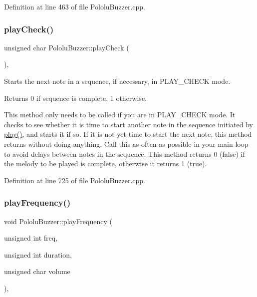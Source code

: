 Definition at line 463 of file Pololu\+Buzzer.\+cpp.

\mbox{\label{class_pololu_buzzer_a427225dcc85c1e65078e4397b9890929}} 
\subsubsection{\texorpdfstring{play\+Check()}{playCheck()}}
{\footnotesize\ttfamily unsigned char Pololu\+Buzzer\+::play\+Check (\begin{DoxyParamCaption}{ }\end{DoxyParamCaption})\hspace{0.3cm}{\ttfamily [static]}, {\ttfamily [inherited]}}



Starts the next note in a sequence, if necessary, in {\ttfamily P\+L\+A\+Y\+\_\+\+C\+H\+E\+CK} mode. 

\begin{DoxyReturn}{Returns}
0 if sequence is complete, 1 otherwise.
\end{DoxyReturn}
This method only needs to be called if you are in {\ttfamily P\+L\+A\+Y\+\_\+\+C\+H\+E\+CK} mode. It checks to see whether it is time to start another note in the sequence initiated by {\ttfamily \hyperlink{class_pololu_buzzer_a22f45ef7cdf9dc8fc54e617244368277}{play()}}, and starts it if so. If it is not yet time to start the next note, this method returns without doing anything. Call this as often as possible in your main loop to avoid delays between notes in the sequence. This method returns 0 (false) if the melody to be played is complete, otherwise it returns 1 (true). 

Definition at line 725 of file Pololu\+Buzzer.\+cpp.

\mbox{\label{class_pololu_buzzer_a931fafd76045ae59d4ba62c9bf90b0dc}} 
\subsubsection{\texorpdfstring{play\+Frequency()}{playFrequency()}}
{\footnotesize\ttfamily void Pololu\+Buzzer\+::play\+Frequency (\begin{DoxyParamCaption}\item[{unsigned int}]{freq,  }\item[{unsigned int}]{duration,  }\item[{unsigned char}]{volume }\end{DoxyParamCaption})\hspace{0.3cm}{\ttfamily [static]}, {\ttfamily [inherited]}}



